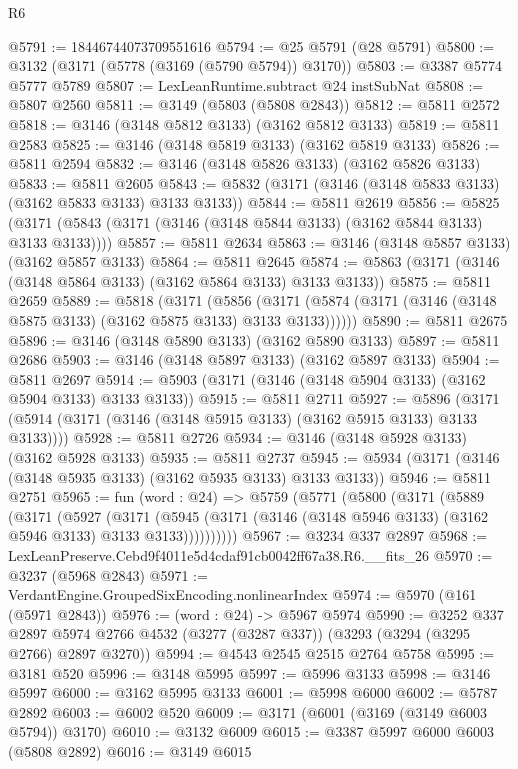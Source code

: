 \begin{lexlean}{R6}
\begin{coremodule}
@5791 := 18446744073709551616
@5794 := @25 @5791 (@28 @5791)
@5800 := @3132 (@3171 (@5778 (@3169 (@5790 @5794)) @3170))
@5803 := @3387 @5774 @5777 @5789
@5807 := LexLeanRuntime.subtract @24 instSubNat
@5808 := @5807 @2560
@5811 := @3149 (@5803 (@5808 @2843))
@5812 := @5811 @2572
@5818 := @3146 (@3148 @5812 @3133) (@3162 @5812 @3133)
@5819 := @5811 @2583
@5825 := @3146 (@3148 @5819 @3133) (@3162 @5819 @3133)
@5826 := @5811 @2594
@5832 := @3146 (@3148 @5826 @3133) (@3162 @5826 @3133)
@5833 := @5811 @2605
@5843 := @5832 (@3171 (@3146 (@3148 @5833 @3133) (@3162 @5833 @3133) @3133 @3133))
@5844 := @5811 @2619
@5856 := @5825 (@3171 (@5843 (@3171 (@3146 (@3148 @5844 @3133) (@3162 @5844 @3133) @3133 @3133))))
@5857 := @5811 @2634
@5863 := @3146 (@3148 @5857 @3133) (@3162 @5857 @3133)
@5864 := @5811 @2645
@5874 := @5863 (@3171 (@3146 (@3148 @5864 @3133) (@3162 @5864 @3133) @3133 @3133))
@5875 := @5811 @2659
@5889 := @5818
    (@3171
      (@5856 (@3171 (@5874 (@3171 (@3146 (@3148 @5875 @3133) (@3162 @5875 @3133) @3133 @3133))))))
@5890 := @5811 @2675
@5896 := @3146 (@3148 @5890 @3133) (@3162 @5890 @3133)
@5897 := @5811 @2686
@5903 := @3146 (@3148 @5897 @3133) (@3162 @5897 @3133)
@5904 := @5811 @2697
@5914 := @5903 (@3171 (@3146 (@3148 @5904 @3133) (@3162 @5904 @3133) @3133 @3133))
@5915 := @5811 @2711
@5927 := @5896 (@3171 (@5914 (@3171 (@3146 (@3148 @5915 @3133) (@3162 @5915 @3133) @3133 @3133))))
@5928 := @5811 @2726
@5934 := @3146 (@3148 @5928 @3133) (@3162 @5928 @3133)
@5935 := @5811 @2737
@5945 := @5934 (@3171 (@3146 (@3148 @5935 @3133) (@3162 @5935 @3133) @3133 @3133))
@5946 := @5811 @2751
@5965 := fun (word : @24) =>
  @5759
    (@5771
      (@5800
        (@3171
          (@5889
            (@3171
              (@5927
                (@3171
                  (@5945 (@3171 (@3146 (@3148 @5946 @3133) (@3162 @5946 @3133) @3133 @3133))))))))))
@5967 := @3234 @337 @2897
@5968 := LexLeanPreserve.Cebd9f4011e5d4cdaf91cb0042ff67a38.R6.__fits_26
@5970 := @3237 (@5968 @2843)
@5971 := VerdantEngine.GroupedSixEncoding.nonlinearIndex
@5974 := @5970 (@161 (@5971 @2843))
@5976 := (word : @24) -> @5967 @5974
@5990 := @3252
    @337
    @2897
    @5974
    @2766
    @4532
    (@3277 (@3287 @337))
    (@3293 (@3294 (@3295 @2766) @2897 @3270))
@5994 := @4543 @2545 @2515 @2764 @5758
@5995 := @3181 @520
@5996 := @3148 @5995
@5997 := @5996 @3133
@5998 := @3146 @5997
@6000 := @3162 @5995 @3133
@6001 := @5998 @6000
@6002 := @5787 @2892
@6003 := @6002 @520
@6009 := @3171 (@6001 (@3169 (@3149 @6003 @5794)) @3170)
@6010 := @3132 @6009
@6015 := @3387 @5997 @6000 @6003 (@5808 @2892)
@6016 := @3149 @6015

\end{coremodule}
\end{lexlean}
